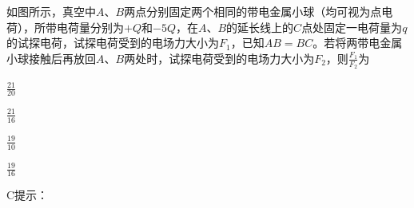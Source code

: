 如图所示，真空中\(A\)、\(B\)两点分别固定两个相同的带电金属小球（均可视为点电荷），所带电荷量分别为\( + Q\)和\( - 5Q \)，在\(A\)、\(B\)的延长线上的\(C\)点处固定一电荷量为\(q\)的试探电荷，试探电荷受到的电场力大小为\(F_1\)，已知\(AB = BC\)。若将两带电金属小球接触后再放回\(A\)、\(B\)两处时，试探电荷受到的电场力大小为\(F_2\)，则\(\frac{F_1}{F_2}\)为\paren[]
	
\begin{choices}
	\item \(\frac{21}{20}\)
	\item \(\frac{21}{16}\)
	\item \(\frac{19}{10}\)
	\item \(\frac{19}{16}\)
\end{choices}
\begin{answer}
	C\qquad 提示：
\end{answer}